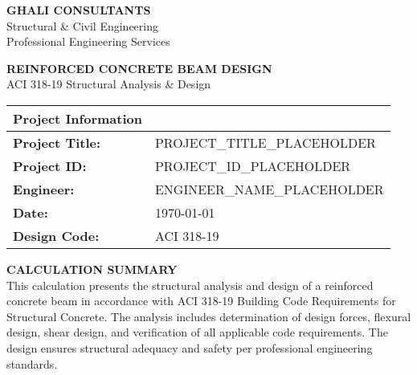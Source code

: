 \documentclass[
  11pt,
  letterpaper,
  onecolumn
]{article}
\begin{document}
\thispagestyle{titlepage}

\begin{center}
{\Huge\textbf{\textcolor{ghaliblue}{GHALI CONSULTANTS}}}\\[0.5cm]
{\Large\textcolor{ghaligray}{Structural \& Civil Engineering}}\\[0.3cm]
{\normalsize\textcolor{ghaligray}{Professional Engineering Services}}
\end{center}

\vspace{1.5cm}

\begin{center}
{\LARGE\textbf{\textcolor{ghalired}{REINFORCED CONCRETE BEAM DESIGN}}}\\[0.3cm]
{\large\textcolor{ghaligray}{ACI 318-19 Structural Analysis \& Design}}
\end{center}

\vspace{1cm}

\begin{center}
\renewcommand{\arraystretch}{1.4}
\begin{tabular}{>{\bfseries}l l}
\toprule
\textbf{\textcolor{ghaliblue}{Project Information}} & \\
\midrule
Project Title: & PROJECT_TITLE_PLACEHOLDER \\
Project ID: & PROJECT_ID_PLACEHOLDER \\
Engineer: & ENGINEER_NAME_PLACEHOLDER \\
Date: & \today \\
Design Code: & ACI 318-19 \\
\bottomrule
\end{tabular}
\end{center}

\vspace{2cm}

\begin{center}
\begin{minipage}{0.85\textwidth}
\textbf{\textcolor{ghaliblue}{CALCULATION SUMMARY}}\\[0.5cm]
This calculation presents the structural analysis and design of a reinforced concrete beam in accordance with ACI 318-19 Building Code Requirements for Structural Concrete. The analysis includes determination of design forces, flexural design, shear design, and verification of all applicable code requirements. The design ensures structural adequacy and safety per professional engineering standards.
\end{minipage}
\end{center}
\end{document}
